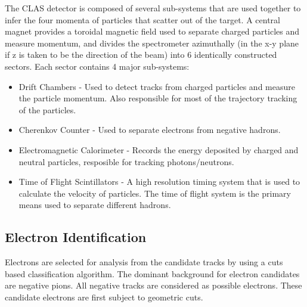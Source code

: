 The CLAS detector is composed of several sub-systems that are used together to infer the four momenta of particles that scatter out of the target.  A central magnet provides a toroidal magnetic field used to separate charged particles and measure momentum, and divides the spectrometer azimuthally (in the x-y plane if z is taken to be the direction of the beam) into 6 identically constructed sectors.  Each sector contains 4 major sub-systems: 

\begin{itemize}
	\item Drift Chambers - Used to detect tracks from charged particles and measure the particle momentum.  Also responsible for most of the trajectory tracking of the particles.
	\item Cherenkov Counter - Used to separate electrons from negative hadrons.
	\item Electromagnetic Calorimeter - Records the energy deposited by charged and neutral particles, resposible for tracking photons/neutrons.
	\item Time of Flight Scintillators - A high resolution timing system that is used to calculate the velocity of particles.  The time of flight system is the primary means used to separate different hadrons.  
\end{itemize}

\subsection{Electron Identification}
Electrons are selected for analysis from the candidate tracks by using a cuts based classification algorithm.  The dominant background for electron candidates are negative pions.  All negative tracks are considered as possible electrons.  These candidate electrons are first subject to geometric cuts.  
\\

